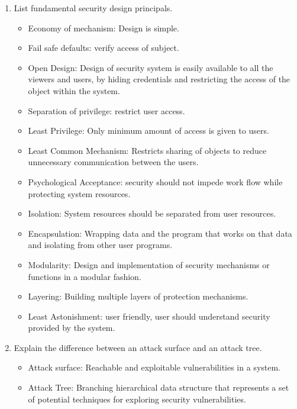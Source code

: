 \documentclass[12pt]{article}
\begin{document}
\begin{enumerate}[label=Q1.\arabic*]
		\item List fundamental security design principals.
			\begin{itemize}
				\item Economy of mechanism: Design is simple.
				\item Fail safe defaults: verify access of subject.
				\item Open Design: Design of security system is easily available to all the viewers and users, by hiding credentials and restricting the access of the object within the system.
				\item Separation of privilege: restrict user access.
				\item Least Privilege: Only minimum amount of access is given to users.
				\item Least Common Mechanism: Restricts sharing of objects to reduce unnecessary communication between the users.
				\item Psychological Acceptance: security should not impede work flow while protecting system resources.
				\item Isolation: System resources should be separated from user resources.
				\item Encapsulation: Wrapping data and the program that works on that data and isolating from other user programs.
				\item Modularity: Design and implementation of security mechanisms or functions in a modular fashion.
				\item Layering: Building multiple layers of protection mechanisms.
				\item Least Astonishment: user friendly, user should understand security provided by the system.
			\end{itemize}
		\item Explain the difference between an attack surface and an attack tree.
			\begin{itemize}
				\item Attack surface: Reachable and exploitable vulnerabilities in a system.
				\item Attack Tree: Branching hierarchical data structure that represents a set of potential techniques for exploring security vulnerabilities.
			\end{itemize}
	\end{enumerate}
\end{document}

